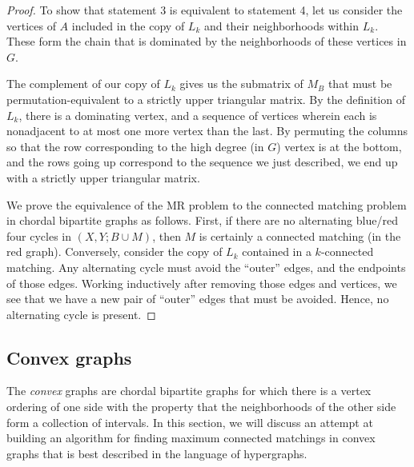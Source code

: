 \begin{proof}
To show that statement 3 is equivalent to statement 4, let us consider the vertices of $A$ included in the copy of $L_k$ and their neighborhoods within $L_k$.  These form the chain that is dominated by the neighborhoods of these vertices in $G$.  

The complement of our copy of $L_k$ gives us the submatrix of $M_B$ that must be permutation-equivalent to a strictly upper triangular matrix.  By the definition of $L_k$, there is a dominating vertex, and a sequence of vertices wherein each is nonadjacent to at most one more vertex than the last.  By permuting the columns so that the row corresponding to the high degree (in $G$) vertex is at the bottom, and the rows going up correspond to the sequence we just described, we end up with a strictly upper triangular matrix.   

We prove the equivalence of the MR problem to the connected matching problem in chordal bipartite graphs as follows.  First, if there are no alternating blue/red four cycles in $(X, Y; B\cup M)$, then $M$ is certainly a connected matching (in the red graph).  Conversely, consider the copy of $L_k$ contained in a $k$-connected matching.  Any alternating cycle must avoid the ``outer'' edges, and the endpoints of those edges.  Working inductively after removing those edges and vertices, we see that we have a new pair of ``outer'' edges that must be avoided.  Hence, no alternating cycle is present.
\end{proof}

\subsection{Convex graphs}

The {\it convex} graphs are chordal bipartite graphs for which there is a vertex ordering of one side with the property that the neighborhoods of the other side form a collection of intervals.  In this section, we will discuss an attempt at building an algorithm for finding maximum connected matchings in convex graphs that is best described in the language of hypergraphs.
%

